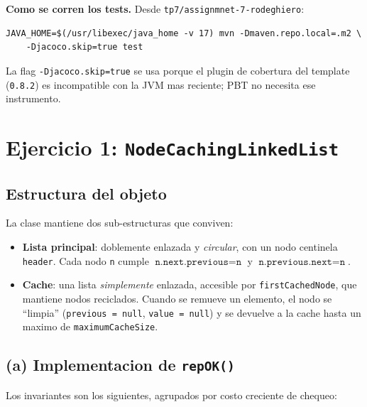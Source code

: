 \documentclass[12pt,a4paper]{article}
\begin{document}
\textbf{Como se corren los tests.} Desde \texttt{tp7/assignmnet-7-rodeghiero}:

\begin{lstlisting}[style=codestyle]
JAVA_HOME=$(/usr/libexec/java_home -v 17) mvn -Dmaven.repo.local=.m2 \
    -Djacoco.skip=true test
\end{lstlisting}

La flag \texttt{-Djacoco.skip=true} se usa porque el plugin de cobertura del template
(\texttt{0.8.2}) es incompatible con la JVM mas reciente; PBT no necesita ese instrumento.

\section{Ejercicio 1: \texttt{NodeCachingLinkedList}}

\subsection{Estructura del objeto}

La clase mantiene dos sub-estructuras que conviven:

\begin{itemize}
  \item \textbf{Lista principal}: doblemente enlazada y \emph{circular}, con un nodo centinela
  \texttt{header}. Cada nodo \texttt{n} cumple
  $\texttt{n.next.previous} = \texttt{n}$ y $\texttt{n.previous.next} = \texttt{n}$.
  \item \textbf{Cache}: una lista \emph{simplemente} enlazada, accesible por
  \texttt{firstCachedNode}, que mantiene nodos reciclados. Cuando se remueve un elemento, el
  nodo se ``limpia'' (\texttt{previous = null}, \texttt{value = null}) y se devuelve a la
  cache hasta un maximo de \texttt{maximumCacheSize}.
\end{itemize}

\subsection{(a) Implementacion de \texttt{repOK()}}

Los invariantes son los siguientes, agrupados por costo creciente de chequeo:
\end{document}

